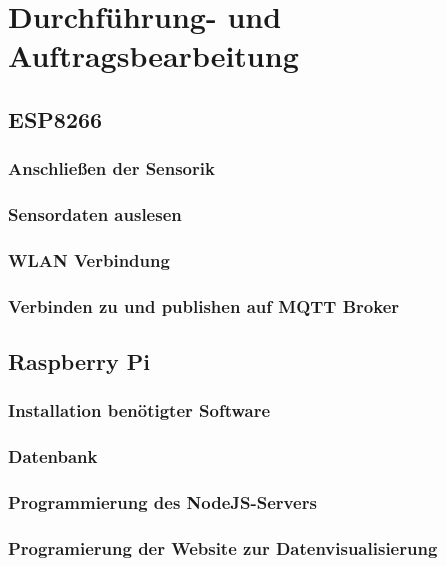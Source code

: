 \chapter{Durchführung- und Auftragsbearbeitung}
\label{cha:Durchfuehrung_und_Auftragsbearbeitung}

\section{ESP8266}
	\subsection{Anschließen der Sensorik}
	
	\subsection{Sensordaten auslesen}
	
	\subsection{WLAN Verbindung}
	
	\subsection{Verbinden zu und publishen auf MQTT Broker}
	
	
\section{Raspberry Pi}
	\subsection{Installation benötigter Software}
	
	\subsection{Datenbank}
	
	\subsection{Programmierung des NodeJS-Servers}
	
	\subsection{Programierung der Website zur Datenvisualisierung}
	